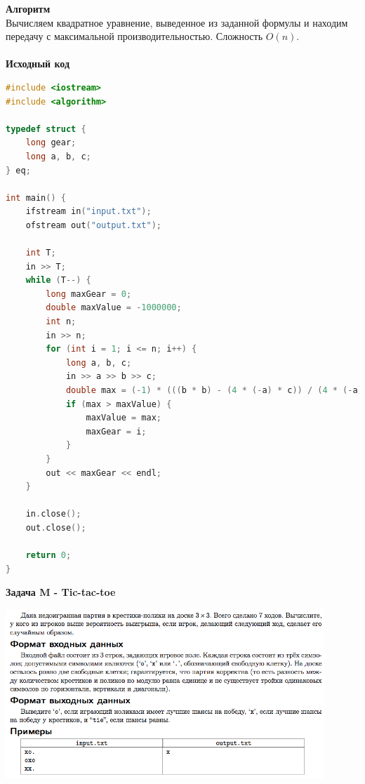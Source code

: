 \documentclass[a4paper,12pt]{article}
\begin{document}
\textbf{{\large Алгоритм}} \\
Вычисляем квадратное уравнение, выведенное из заданной формулы и находим передачу с максимальной производительностью. Сложность $O(n)$. \\ 
\\
\textbf{{\large Исходный код}}
\begin{lstlisting}[language=C++]
#include <iostream>
#include <algorithm>

typedef struct {
    long gear;
    long a, b, c;
} eq;

int main() {
    ifstream in("input.txt");
    ofstream out("output.txt");

    int T;
    in >> T;
    while (T--) {
        long maxGear = 0;
        double maxValue = -1000000;
        int n;
        in >> n;
        for (int i = 1; i <= n; i++) {
            long a, b, c;
            in >> a >> b >> c;
            double max = (-1) * (((b * b) - (4 * (-a) * c)) / (4 * (-a)));
            if (max > maxValue) {
                maxValue = max;
                maxGear = i;
            }
        }
        out << maxGear << endl;
    }

    in.close();
    out.close();

    return 0;
}
\end{lstlisting}
\newpage
\textbf{{\large Задача M - Tic-tac-toe}} \\
\begin{center}
\includegraphics[width=0.9\textwidth]{OC_Udmurtia/OC_Udmurtia_M.png}\\ [1cm]
\end{center}
\newpage
\end{document}
